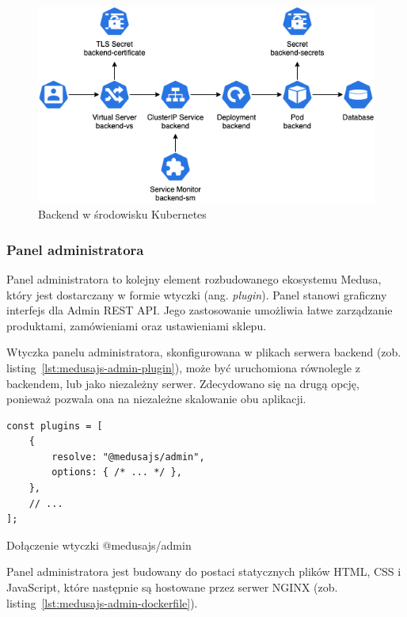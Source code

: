 \begin{figure}[H]
    \centering
    \includegraphics[width=\textwidth]{img/kubernetes-backend}
    \caption{Backend w środowisku Kubernetes}
    \label{fig:kubernetes-backend}
\end{figure}

\subsubsection{Panel administratora}

Panel administratora to kolejny element rozbudowanego ekosystemu Medusa, który jest dostarczany w formie wtyczki (ang. \emph{plugin}).
Panel stanowi graficzny interfejs dla Admin REST API. Jego zastosowanie umożliwia łatwe zarządzanie produktami, zamówieniami oraz ustawieniami sklepu.

Wtyczka panelu administratora, skonfigurowana w plikach serwera backend (zob. listing~\ref{lst:medusajs-admin-plugin}), może być uruchomiona równolegle z backendem, lub jako niezależny serwer.
Zdecydowano się na drugą opcję, ponieważ pozwala ona na niezależne skalowanie obu aplikacji.

\begin{listing}[H]
        \begin{verbatim}
const plugins = [
    {
        resolve: "@medusajs/admin",
        options: { /* ... */ },
    },
    // ...
];
        \end{verbatim}
    \caption{Dołączenie wtyczki @medusajs/admin}
    \label{lst:medusajs-admin-plugin}
\end{listing}

Panel administratora jest budowany do postaci statycznych plików HTML, CSS i JavaScript, które następnie są hostowane przez serwer NGINX (zob. listing~\ref{lst:medusajs-admin-dockerfile}).

